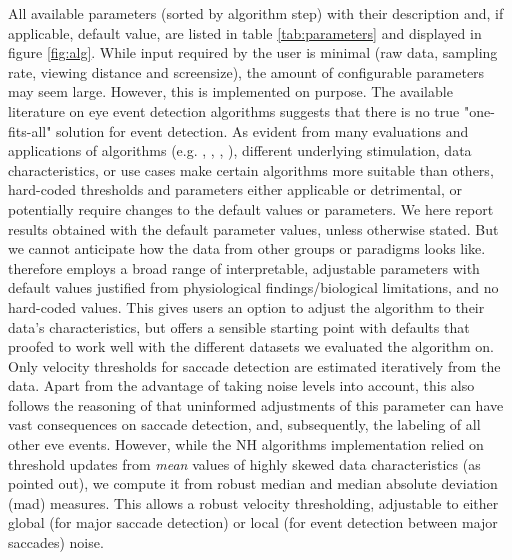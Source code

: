 All available parameters (sorted by algorithm step) with their description and, if applicable, default value, are listed in table \ref{tab:parameters} and displayed in figure \ref{fig:alg}. While input required by the user is minimal (raw data, sampling rate, viewing distance and screensize), the amount of configurable parameters may seem large. However, this is implemented on purpose.
The available literature on eye event detection algorithms suggests that there is no true "one-fits-all" solution for event detection. As evident from many evaluations and applications of algorithms (e.g. \cite{Andersson2017}, \cite{Larsson2013}, \cite{Zemblys2018}, \cite{5523936}), different underlying stimulation, data characteristics, or use cases make certain algorithms more suitable than others, hard-coded thresholds and parameters either applicable or detrimental, or potentially require changes to the default values or parameters. We here report results obtained with the default parameter values, unless otherwise stated. But we cannot anticipate how the data from other groups or paradigms looks like. \remodnav therefore employs a broad range of interpretable, adjustable parameters with default values justified from physiological findings/biological limitations, and no hard-coded values. This gives users an option to adjust the algorithm to their data's characteristics, but offers a sensible starting point with defaults that proofed to work well with the different datasets we evaluated the algorithm on. Only velocity thresholds for saccade detection are estimated iteratively from the data. Apart from the advantage of taking noise levels into account, this also follows the reasoning of \cite{Nystrom2010AnData} that uninformed adjustments of this parameter can have vast consequences on saccade detection, and, subsequently, the labeling of all other eve events. However, while the NH algorithms implementation relied on threshold updates from \textit{mean} values of highly skewed data characteristics (as \cite{Friedman2018} pointed out), we compute it from robust median and median absolute deviation (mad) measures. This allows a robust velocity thresholding, adjustable to either global (for major saccade detection) or local (for event detection between major saccades) noise.



